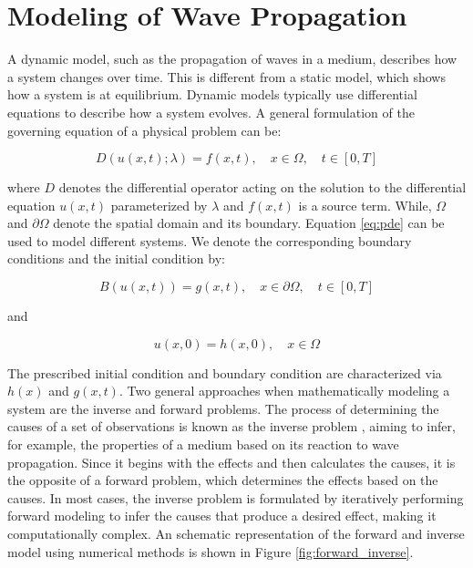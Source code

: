 \documentclass[11pt,twoside]{article}
\begin{document}
\section{Modeling of Wave Propagation}\label{sec:modeling_wave_propagation}

A dynamic model, such as the propagation of waves in a medium, describes how a system changes over time. This is 
different from a static model, which shows how a system is at equilibrium. Dynamic models typically use differential 
equations to describe how a system evolves. A general formulation of the governing equation of a physical problem can be:

\begin{equation*}
D(u(x,t); \lambda) = f(x,t), \quad x \in \Omega, \quad t \in [0, T]\label{eq:pde}
\end{equation*}
 
where $D$ denotes the differential operator acting on the solution to the differential equation $u(x,t)$ parameterized 
by $\lambda$ and $f(x, t)$ is a source term. While, $\Omega$ and $\partial\Omega$ denote the spatial domain and its boundary. 
Equation \ref{eq:pde} can be used to model different systems. We denote the corresponding boundary conditions and the 
initial condition by:

\begin{equation*}
B (u(x, t)) = g(x, t), \quad x \in \partial \Omega, \quad t \in [0, T] 
\end{equation*}

and

\begin{equation*}
u(x, 0) = h(x, 0), \quad x \in \Omega
\end{equation*}

The prescribed initial condition and boundary condition are characterized via $h(x)$ and $g(x, t)$. Two general approaches 
when mathematically modeling a system are the inverse and forward problems. The process of determining the causes 
of a set of observations is known as the inverse problem \citep{Tarantola}, aiming to infer, for example, the properties of a 
medium based on its reaction to wave propagation. Since it begins with the effects and then calculates the causes, it is the 
opposite of a forward problem, which determines the effects based on the causes. In most cases, the inverse problem is formulated 
by iteratively performing forward modeling to infer the causes that produce a desired effect, making it computationally complex. 
An schematic representation of the forward and inverse model using numerical methods is shown in Figure \ref{fig:forward_inverse}.
\end{document}

